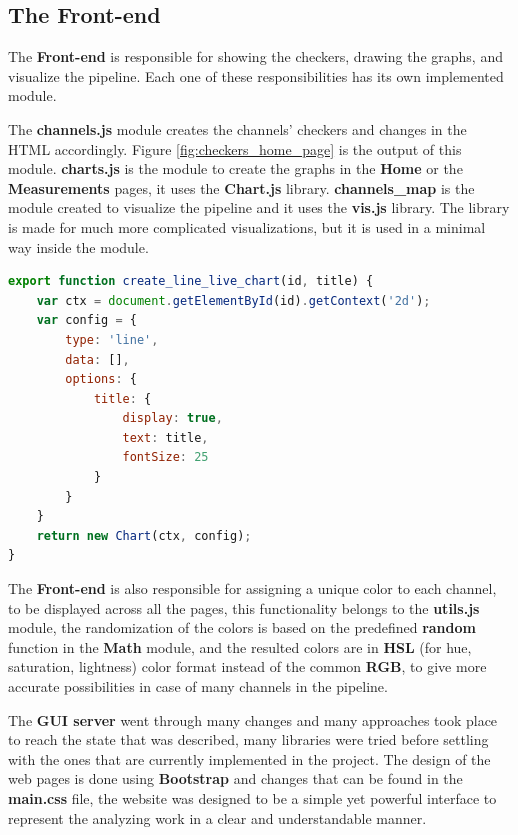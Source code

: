 \subsection{The Front-end}
The \textbf{Front-end} is responsible for showing the checkers, drawing the graphs, and visualize
the pipeline. Each one of these responsibilities has its own implemented module.

The \textbf{channels.js} module creates the channels' checkers and changes in the HTML accordingly. 
Figure \ref{fig:checkers_home_page} is the output of this module. \textbf{charts.js} is the module to create the graphs in the \textbf{Home} or the \textbf{Measurements}
pages, it uses the \textbf{Chart.js}\cite{chart.js} library. \textbf{channels\_map} is the module created to visualize the pipeline and it uses the \textbf{vis.js}\cite{vis.js}
library. The library is made for much more complicated visualizations, but it is used in a minimal way inside the
module.
\newline
\begin{lstlisting}[language=JavaScript, caption={Creating a graph},captionpos=b]
export function create_line_live_chart(id, title) {
	var ctx = document.getElementById(id).getContext('2d');
	var config = {
		type: 'line',
		data: [],
		options: {
			title: {
				display: true,
				text: title,
				fontSize: 25
			}
		}
	}
	return new Chart(ctx, config);
}
\end{lstlisting}

The \textbf{Front-end} is also responsible for assigning a unique color to each channel, to be
displayed across all the pages, this functionality belongs to the \textbf{utils.js} module, the
randomization of the colors is based on the predefined \textbf{random} function
in the \textbf{Math} module, and the resulted colors are in \textbf{HSL} (for hue, saturation, lightness) 
color format instead of the common \textbf{RGB}, to give more accurate possibilities in case of
many channels in the pipeline.

The \textbf{GUI server} went through many changes and many approaches took place to
reach the state that was described, many libraries were tried before settling with the
ones that are currently implemented in the project. The design of the web pages is done using
\textbf{Bootstrap}\cite{bootstrap} and changes that can be found in the \textbf{main.css} file, the website was
designed to be a simple yet powerful interface to represent the analyzing work in a clear and
understandable manner.

